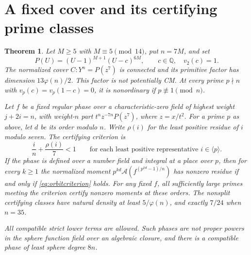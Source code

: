 \documentclass[11pt]{article}
\newtheorem{theorem}{Theorem}
\newcommand{\A}{\mathcal A}
\newcommand{\Q}{\mathbb Q}
\begin{document}
\section{A fixed cover and its certifying prime classes}

\begin{theorem}\label{thm:fixedcover}
Let \(M\ge5\) with \(M\equiv5\pmod{14}\), put \(n=7M\), and set
\[
           P(U)=(U-1)^{M+1}(U-c)^{6M},\qquad c\in\Q,\quad v_2(c)=1.
\]
The normalized cover \(C\colon Y^n=P(z^7)\) is connected and its
primitive factor has dimension \(13\varphi(n)/2\). This factor is
not potentially CM. At every prime \(p\nmid n\) with
\(v_p(c)=v_p(1-c)=0\), it is nonordinary if \(p\not\equiv1\pmod n\).

Let \(f\) be a fixed regular phase over a characteristic-zero field
of highest weight \(j+2i=n\), with weight-\(n\) part
\(t^n z^{-7n}P(z^7)\), where \(z=x/t^2\). For a prime \(p\) as above,
let \(d\) be its order modulo \(n\). Write \(\rho(i)\) for the
least positive residue of \(i\) modulo seven. The certifying criterion is
\begin{equation}\label{eq:orbitcriterion}
           \frac{i}{n}+\frac{\rho(i)}7<1
         \qquad\text{for each least positive representative }i\in\langle p\rangle.
\end{equation}
If the phase is defined over a number field and integral at a place
over \(p\), then for every \(k\ge1\) the normalized moment
\(p^{kd}\A(f^{(p^{kd}-1)/n})\) has nonzero residue if and only if
\eqref{eq:orbitcriterion} holds.
For any fixed \(f\), all sufficiently large primes meeting the criterion
certify nonzero moments at these orders. The nonsplit certifying classes
have natural density at least \(5/\varphi(n)\), and exactly \(7/24\) when
\(n=35\).

All compatible strict lower terms are allowed. Such phases are not proper
powers in the sphere function field over an algebraic closure, and there
is a compatible phase of least sphere degree \(8n\).
\end{theorem}
\end{document}
